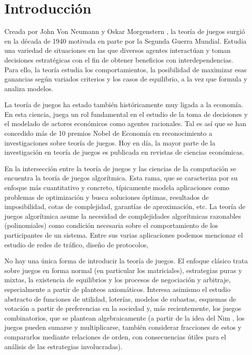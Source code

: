 \chapter{Introducción} \label{cap:intro}

Creada por John Von Neumann y Oskar Morgenstern , la teoría de juegos surgió en la década de 1940 motivada en parte por la Segunda Guerra Mundial. Estudia una variedad de situaciones en las que diversos agentes interactúan y toman decisiones estratégicas con el fin de obtener beneficios con interdependencias. Para ello, la teoría estudia los comportamientos, la posibilidad de maximizar esas ganancias según variados criterios y los casos de equilibrio, a la vez que formula y analiza modelos.

La teoría de juegos ha estado también históricamente muy ligada a la economía. En esta ciencia, juega un rol fundamental en el estudio de la toma de decisiones y el modelado de actores económicos como agentes racionales. Tal es así que se han concedido más de 10 premios Nobel de Economía en reconocimiento a investigaciones sobre teoría de juegos. Hoy en día, la mayor parte de la investigación en teoría de juegos es publicada en revistas de ciencias económicas.

En la intersección entre la teoría de juegos y las ciencias de la computación se encuentra la teoría de juegos algorítmica. Esta rama, que se caracteriza por su enfoque más cuantitativo y concreto, típicamente modela aplicaciones como problemas de optimización y busca soluciones óptimas, resultados de imposibilidad, cotas de complejidad, garantías de aproximación, etc. La teoría de juegos algorítmica asume la necesidad de complejidades algorítmicas razonables (polinomiales) como condición necesaria sobre el comportamiento de los participantes de un sistema. Entre sus varias aplicaciones podemos mencionar el estudio de redes de tráfico, diseño de protocolos, 


No hay una única forma de introducir la teoría de juegos. El enfoque clásico trata sobre juegos en forma normal (en particular los matriciales), estrategias puras y mixtas, la existencia de equilibrios y los procesos de negociación y arbitraje, especialmente a partir de planteos axiomáticos. Interesa asimismo el estudio abstracto de funciones de utilidad, loterías, modelos de subastas, esquemas de votación a partir de preferencias en la sociedad y, más recientemente, los juegos combinatorios, que se plantean algebraicamente (a partir de la idea del Nim , los juegos pueden sumarse y multiplicarse, también considerar fracciones de estos y compararlos mediante relaciones de orden, con consecuencias útiles para el análisis de las estrategias involucradas).

